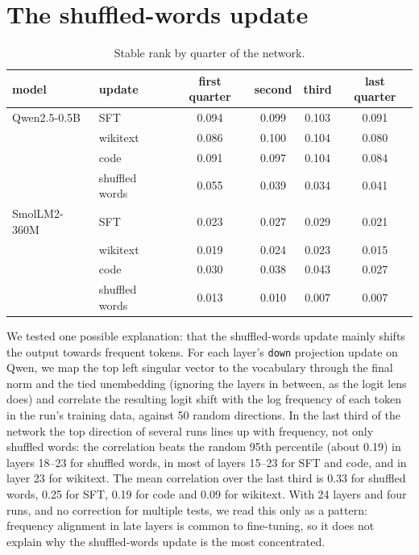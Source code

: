 \section{The shuffled-words update}
\label{app:shuffled}

\begin{table}[H]
\caption{Stable rank by quarter of the network.}
\label{tab:shuffled}
\begin{center}
\small
\begin{tabular}{llcccc}
\toprule
model & update & first quarter & second & third & last quarter \\
\midrule
Qwen2.5-0.5B & SFT            & 0.094 & 0.099 & 0.103 & 0.091 \\
             & wikitext       & 0.086 & 0.100 & 0.104 & 0.080 \\
             & code           & 0.091 & 0.097 & 0.104 & 0.084 \\
             & shuffled words & 0.055 & 0.039 & 0.034 & 0.041 \\
\midrule
SmolLM2-360M & SFT            & 0.023 & 0.027 & 0.029 & 0.021 \\
             & wikitext       & 0.019 & 0.024 & 0.023 & 0.015 \\
             & code           & 0.030 & 0.038 & 0.043 & 0.027 \\
             & shuffled words & 0.013 & 0.010 & 0.007 & 0.007 \\
\bottomrule
\end{tabular}
\end{center}
\end{table}

We tested one possible explanation: that the shuffled-words update mainly
shifts the output towards frequent tokens. For each layer's
\texttt{down} projection update on Qwen, we map the top left singular vector to the
vocabulary through the final norm and the tied unembedding (ignoring the
layers in between, as the logit lens does) and correlate the resulting logit
shift with the log frequency of each token in the run's training data,
against 50 random directions. In the last third of the network the top
direction of several runs lines up with frequency, not only shuffled words:
the correlation beats the random 95th percentile (about 0.19) in layers 18--23
for shuffled words, in most of layers 15--23 for SFT and code, and in layer 23
for wikitext. The mean correlation over the last third is 0.33 for shuffled
words, 0.25 for SFT, 0.19 for code and 0.09 for wikitext. With 24 layers and
four runs, and no correction for multiple tests, we read this only as a
pattern: frequency alignment in late layers is common to fine-tuning, so it
does not explain why the shuffled-words update is the most concentrated.

